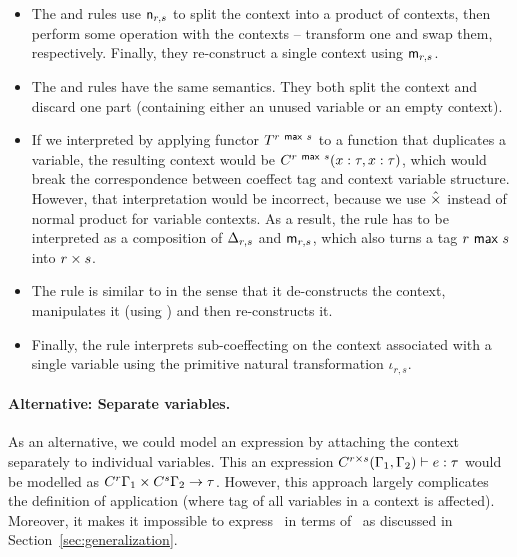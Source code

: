 \begin{itemize}
\item The  and  rules use $\textnormal{\sffamily n}_{r, s}$ to split the context into a product
  of contexts, then perform some operation with the contexts -- transform one and swap them, respectively.
  Finally, they re-construct a single context using $\textnormal{\sffamily m}_{r, s}$.

\item The  and  rules have the same semantics. They both split the context
  and discard one part (containing either an unused variable or an empty context).

\item If we interpreted  by applying functor $T^{r~\textnormal{\sffamily max}~ s}$ to a function that duplicates
  a variable, the resulting context would be $C^{r ~\textnormal{\sffamily max}~ s}(x:\tau, x:\tau)$, which would break the
  correspondence between coeffect tag and context variable structure. However, that interpretation would be
  incorrect, because we use $\hat{\times}$ instead of normal product for variable contexts. As a result, the
  rule has to be interpreted as a composition of $\Delta_{r, s}$ and $\textnormal{\sffamily m}_{r, s}$, which also turns
  a tag $r ~\textnormal{\sffamily max}~ s$ into $r \times s$.

\item The  rule is similar to  in the sense that it de-constructs the context,
  manipulates it (using ) and then re-constructs it.

\item Finally, the  rule interprets sub-coeffecting on the context associated with a single
  variable using the primitive natural transformation $\iota_{r, s}$.
\end{itemize}

\paragraph{Alternative: Separate variables.} As an alternative, we could model an expression by
attaching the context separately to individual variables. This an expression
$C^{r \times s}(\Gamma_1, \Gamma_2) \vdash e : \tau$ would be modelled as 
$C^{r}\Gamma_1 \times C^{s}\Gamma_2 \rightarrow \tau$. However, this 
approach largely complicates the definition of application (where tag of all 
variables in a context is affected). Moreover, it makes it impossible to express
\clflt~in terms of \clstr~as discussed in Section~\ref{sec:generalization}.

